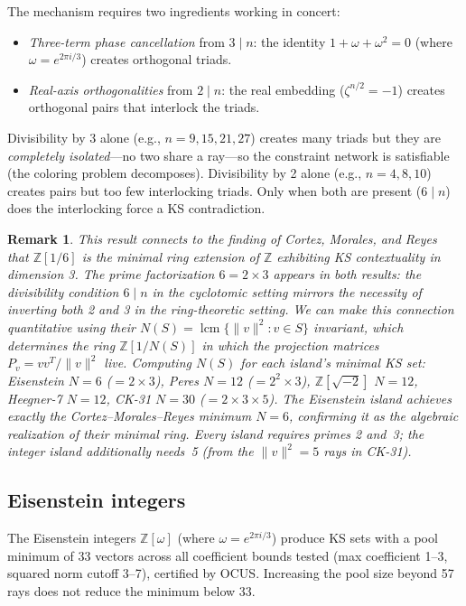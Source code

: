 \documentclass[12pt,a4paper]{article}
\newtheorem{remark}[theorem]{Remark}
\newcommand{\Z}{\mathbb{Z}}
\begin{document}
The mechanism requires two ingredients working in concert:
\begin{itemize}
    \item \emph{Three-term phase cancellation} from $3 \mid n$: the identity $1 + \omega + \omega^2 = 0$ (where $\omega = e^{2\pi i/3}$) creates orthogonal triads.
    \item \emph{Real-axis orthogonalities} from $2 \mid n$: the real embedding ($\zeta^{n/2} = -1$) creates orthogonal pairs that interlock the triads.
\end{itemize}

Divisibility by 3 alone (e.g., $n = 9, 15, 21, 27$) creates many triads but they are \emph{completely isolated}---no two share a ray---so the constraint network is satisfiable (the coloring problem decomposes). Divisibility by 2 alone (e.g., $n = 4, 8, 10$) creates pairs but too few interlocking triads. Only when both are present ($6 \mid n$) does the interlocking force a KS contradiction.

\begin{remark}
This result connects to the finding of Cortez, Morales, and Reyes~\cite{CortezMoralesReyes2022} that $\Z[1/6]$ is the minimal ring extension of $\Z$ exhibiting KS contextuality in dimension 3. The prime factorization $6 = 2 \times 3$ appears in both results: the divisibility condition $6 \mid n$ in the cyclotomic setting mirrors the necessity of inverting both 2 and 3 in the ring-theoretic setting. We can make this connection quantitative using their $N(S) = \operatorname{lcm}\{\|v\|^2 : v \in S\}$ invariant, which determines the ring $\Z[1/N(S)]$ in which the projection matrices $P_v = vv^T/\|v\|^2$ live. Computing $N(S)$ for each island's minimal KS set: Eisenstein $N = 6$ ($= 2 \times 3$), Peres $N = 12$ ($= 2^2 \times 3$), $\Z[\sqrt{-2}]$ $N = 12$, Heegner-7 $N = 12$, CK-31 $N = 30$ ($= 2 \times 3 \times 5$). The Eisenstein island achieves exactly the Cortez--Morales--Reyes minimum $N = 6$, confirming it as the algebraic realization of their minimal ring. Every island requires primes 2 and~3; the integer island additionally needs~5 (from the $\|v\|^2 = 5$ rays in CK-31).
\end{remark}

\subsection{Eisenstein integers}

The Eisenstein integers $\Z[\omega]$ (where $\omega = e^{2\pi i/3}$) produce KS sets with a pool minimum of 33 vectors across all coefficient bounds tested (max coefficient 1--3, squared norm cutoff 3--7), certified by OCUS. Increasing the pool size beyond 57 rays does not reduce the minimum below 33.
\end{document}
